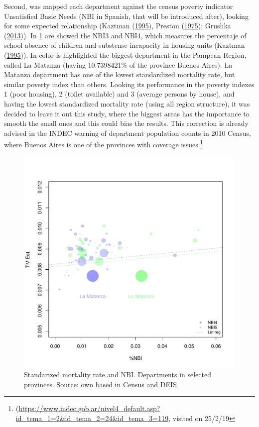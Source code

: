 \documentclass[12pt,]{article}
\begin{document}
Second, was mapped each department against the census poverty indicator
Unsatisfied Basic Needs (NBI in Spanish, that will be introduced after),
looking for some expected relationship (Kaztman
(\protect\hyperlink{ref-Kaztman1995}{1995}), Preston
(\protect\hyperlink{ref-Preston_1975}{1975}); Grushka
(\protect\hyperlink{ref-Grushka2013}{2013})). In \ref{fig:NBI} are
showed the NBI3 and NBI4, which measures the percentaje of school
absence of children and substense incapacity in housing units (Kaztman
(\protect\hyperlink{ref-Kaztman1995}{1995})). In color is highlighted
the biggest department in the Pampean Region, called La Matanza (having
10.7398421\% of the province Buenos Aires). La Matanza department has
one of the lowest standardized mortality rate, but similar poverty index
than others. Looking its performance in the poverty indexes 1 (poor
housing), 2 (toilet available) and 3 (average persons by house), and
having the lowest standardized mortality rate (using all region
structure), it was decided to leave it out this study, where the biggest
areas has the importance to smooth the small ones and this could bias
the results. This correction is already advised in the INDEC warning of
department population counts in 2010 Census, where Buenos Aires is one
of the provinces with coverage issues.\footnote{(\url{https://www.indec.gob.ar/nivel4_default.asp?id_tema_1=2\&id_tema_2=24\&id_tema_3=119},
  visited on 25/2/19}

\begin{figure}

{\centering \includegraphics[width=0.7\linewidth]{analysis/plots/ChekNBI} 

}

\caption{Standarized mortality rate and NBI. Departments in selected provinces. Source: own based in Census and DEIS}\label{fig:NBI}
\end{figure}
\end{document}
